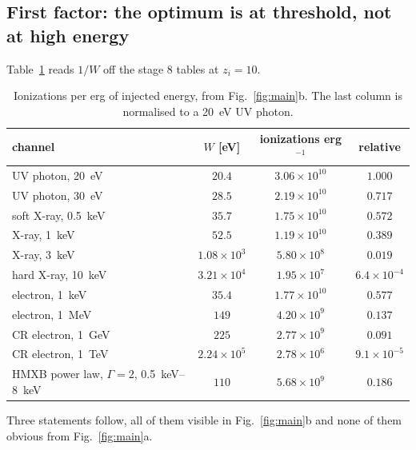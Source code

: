 \documentclass[11pt,a4paper]{article}
\begin{document}
\subsection{First factor: the optimum is at threshold, not at high energy}

Table~\ref{tab:pererg} reads $1/W$ off the stage 8 tables at $z_i=10$.

\begin{table}[htbp]
\centering
\caption{Ionizations per erg of injected energy, from
Fig.~\ref{fig:main}b. The last column is normalised to a
\SI{20}{\electronvolt} UV photon.}
\label{tab:pererg}
\begin{tabular}{lccc}
\toprule
channel & $W$ [eV] & ionizations erg$^{-1}$ & relative \\
\midrule
UV photon, \SI{20}{\electronvolt}        & $20.4$              & $3.06\times10^{10}$ & $1.000$ \\
UV photon, \SI{30}{\electronvolt}        & $28.5$              & $2.19\times10^{10}$ & $0.717$ \\
soft X-ray, \SI{0.5}{\kilo\electronvolt} & $35.7$              & $1.75\times10^{10}$ & $0.572$ \\
X-ray, \SI{1}{\kilo\electronvolt}        & $52.5$              & $1.19\times10^{10}$ & $0.389$ \\
X-ray, \SI{3}{\kilo\electronvolt}        & $1.08\times10^{3}$  & $5.80\times10^{8}$  & $0.019$ \\
hard X-ray, \SI{10}{\kilo\electronvolt}  & $3.21\times10^{4}$  & $1.95\times10^{7}$  & $6.4\times10^{-4}$ \\
\midrule
electron, \SI{1}{\kilo\electronvolt}     & $35.4$              & $1.77\times10^{10}$ & $0.577$ \\
electron, \SI{1}{\mega\electronvolt}     & $149$               & $4.20\times10^{9}$  & $0.137$ \\
CR electron, \SI{1}{\giga\electronvolt}  & $225$               & $2.77\times10^{9}$  & $0.091$ \\
CR electron, \SI{1}{\tera\electronvolt}  & $2.24\times10^{5}$  & $2.78\times10^{6}$  & $9.1\times10^{-5}$ \\
\midrule
HMXB power law, $\Gamma=2$, \SIrange{0.5}{8}{\kilo\electronvolt}
  & $110$ & $5.68\times10^{9}$ & $0.186$ \\
\bottomrule
\end{tabular}
\end{table}

Three statements follow, all of them visible in Fig.~\ref{fig:main}b and none
of them obvious from Fig.~\ref{fig:main}a.
\end{document}
